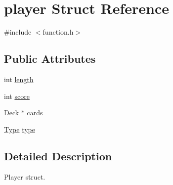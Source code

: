 \hypertarget{structplayer}{\section{player Struct Reference}
\label{structplayer}
}


{\ttfamily \#include $<$function.\+h$>$}

\subsection*{Public Attributes}
\begin{DoxyCompactItemize}
\item 
int \hyperlink{structplayer_a6d670ec4ace3ecf0f24cfce0e91d8f58}{length}
\item 
int \hyperlink{structplayer_a0effac341657c96528752f808fa23291}{score}
\item 
\hyperlink{function_8h_aca76a74d321b685f1452e9320682eaf2}{Deck} $\ast$ \hyperlink{structplayer_ac6f2eae012a4e35f71eec51303ec0d9d}{cards}
\item 
\hyperlink{function_8h_ae8dde500cc5d4c2fdca72e1f2a6c2543}{Type} \hyperlink{structplayer_a59539d94e84700858ac1b21e93bdfa83}{type}
\end{DoxyCompactItemize}


\subsection{Detailed Description}
Player struct. 

